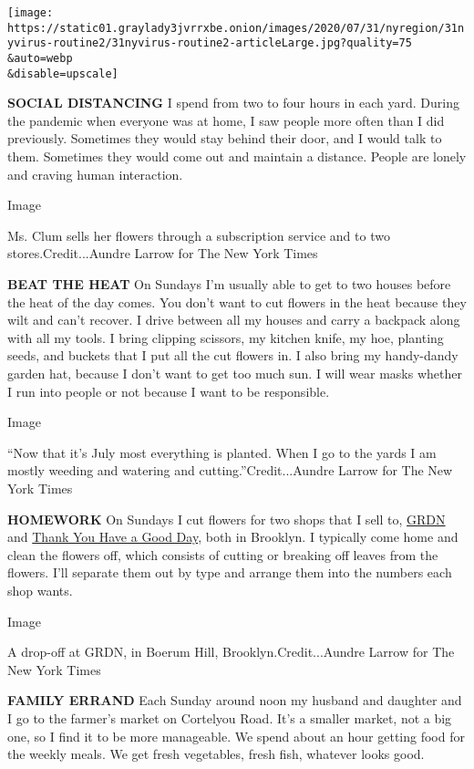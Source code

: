 \texttt{[image: https://static01.graylady3jvrrxbe.onion/images/2020/07/31/nyregion/31nyvirus-routine2/31nyvirus-routine2-articleLarge.jpg?quality=75\\\&auto=webp\\\&disable=upscale]}

\textbf{SOCIAL DISTANCING} I spend from two to four hours in each yard.
During the pandemic when everyone was at home, I saw people more often
than I did previously. Sometimes they would stay behind their door, and
I would talk to them. Sometimes they would come out and maintain a
distance. People are lonely and craving human interaction.

Image

Ms. Clum sells her flowers through a subscription service and to two
stores.Credit...Aundre Larrow for The New York Times

\textbf{BEAT THE HEAT} On Sundays I'm usually able to get to two houses
before the heat of the day comes. You don't want to cut flowers in the
heat because they wilt and can't recover. I drive between all my houses
and carry a backpack along with all my tools. I bring clipping scissors,
my kitchen knife, my hoe, planting seeds, and buckets that I put all the
cut flowers in. I also bring my handy-dandy garden hat, because I don't
want to get too much sun. I will wear masks whether I run into people or
not because I want to be responsible.

Image

``Now that it's July most everything is planted. When I go to the yards
I am mostly weeding and watering and cutting.''Credit...Aundre Larrow
for The New York Times

\textbf{HOMEWORK} On Sundays I cut flowers for two shops that I sell to,
\href{https://grdnbklyn.com/}{GRDN} and
\href{https://www.thankyouhaveagoodday.com/}{Thank You Have a Good Day},
both in Brooklyn. I typically come home and clean the flowers off, which
consists of cutting or breaking off leaves from the flowers. I'll
separate them out by type and arrange them into the numbers each shop
wants.

Image

A drop-off at GRDN, in Boerum Hill, Brooklyn.Credit...Aundre Larrow for
The New York Times

\textbf{FAMILY ERRAND} Each Sunday around noon my husband and daughter
and I go to the farmer's market on Cortelyou Road. It's a smaller
market, not a big one, so I find it to be more manageable. We spend
about an hour getting food for the weekly meals. We get fresh
vegetables, fresh fish, whatever looks good.

